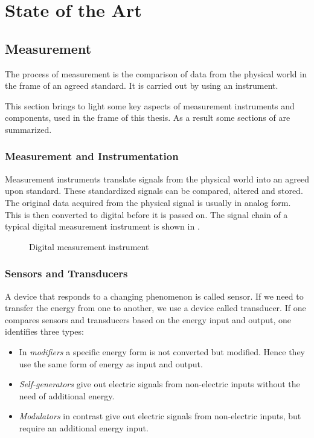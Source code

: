 \chapter{State of the Art}
\label{chap:\currfilebase}

\section{Measurement}
The process of measurement is the comparison of data from the physical world in the frame of an agreed standard. It is carried out by using an instrument.

This section brings to light some key aspects of measurement instruments and components, used in the frame of this thesis. As a result some sections of \cite{webster2018measurement} are summarized.

\subsection{Measurement and Instrumentation}

Measurement instruments translate signals from the physical world into an agreed upon standard. These standardized signals can be compared, altered and stored.
The original data acquired from the physical signal is usually in analog form. This is then converted to digital before it is passed on. The signal chain of a typical digital measurement instrument is shown in .

\cite{webster2018measurement}
\begin{figure}[!htb]
    \centering
    
    \caption[Digital instrument]{Digital measurement instrument}
    \label{fig:digital_instrument}
\end{figure}

\subsection{Sensors and Transducers}
A device that responds to a changing phenomenon is called sensor. If we need to transfer the energy from one to another, we use a device called transducer. If one compares sensors and transducers based on the energy input and output, one identifies three types:
\begin{itemize}
    \item In \emph{modifiers} a specific energy form is not converted but modified. Hence they use the same form of energy as input and output.
    \item \emph{Self-generators} give out electric signals from non-electric inputs without the need of additional energy.
    \item \emph{Modulators} in contrast give out electric signals from non-electric inputs, but require an additional energy input.
\end{itemize}

